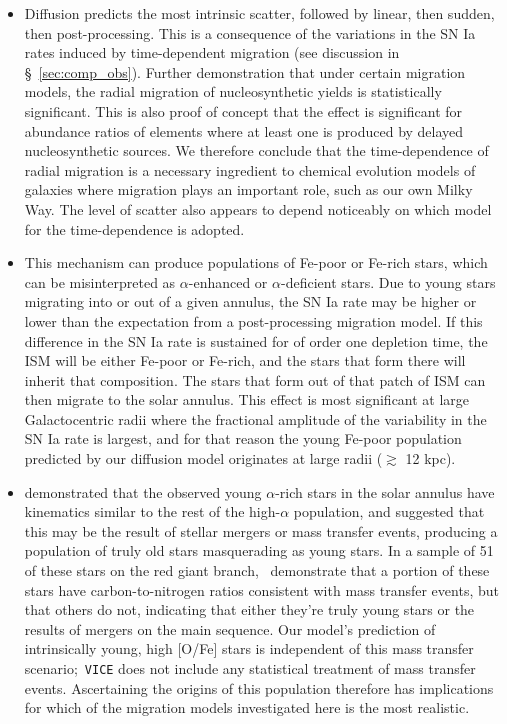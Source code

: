 \documentclass[fleqn, usenatbib]{mnras}
\begin{document}
\begin{itemize}
	\item Diffusion predicts the most intrinsic scatter, followed by linear, 
	then sudden, then post-processing. This is a consequence of the variations 
	in the SN Ia rates induced by time-dependent migration (see discussion in 
	\S~\ref{sec:comp_obs}). Further demonstration that under 
	certain migration models, the radial migration of nucleosynthetic yields 
	is statistically significant. This is also proof of concept that the 
	effect is significant for abundance ratios of elements where at least one 
	is produced by delayed nucleosynthetic sources. We therefore conclude that 
	the time-dependence of radial migration is a necessary ingredient to 
	chemical evolution models of galaxies where migration plays an important 
	role, such as our own Milky Way. The level of scatter also appears to 
	depend noticeably on which model for the time-dependence is adopted. 

	\item This mechanism can produce populations of Fe-poor or Fe-rich stars, 
	which can be misinterpreted as $\alpha$-enhanced or $\alpha$-deficient 
	stars. Due to young stars migrating into or out of a given annulus, the SN 
	Ia rate may be higher or lower than the expectation from a post-processing 
	migration model. If this difference in the SN Ia rate is sustained for of 
	order one depletion time, the ISM will be either Fe-poor or Fe-rich, and 
	the stars that form there will inherit that composition. The stars that 
	form out of that patch of ISM can then migrate to the solar annulus. This 
	effect is most significant at large Galactocentric radii where the 
	fractional amplitude of the variability in the SN Ia rate is largest, and 
	for that reason the young Fe-poor population predicted by our diffusion 
	model originates at large radii ($\gtrsim$ 12 kpc). 

	\item \citet{SilvaAguirre2018} demonstrated that the observed young 
	$\alpha$-rich stars in the solar annulus have kinematics similar to the 
	rest of the high-$\alpha$ population, and suggested that this may be the 
	result of stellar mergers or mass transfer events, producing a population 
	of truly old stars masquerading as young stars. In a sample of 51 of these 
	stars on the red giant branch,~\citet{Hekker2019} demonstrate that a 
	portion of these stars have carbon-to-nitrogen ratios consistent with 
	mass transfer events, but that others do not, indicating that either 
	they're truly young stars or the results of mergers on the main sequence. 
	Our model's prediction of intrinsically young, high [O/Fe] stars is 
	independent of this mass transfer scenario;~\texttt{VICE} does not include 
	any statistical treatment of mass transfer events. Ascertaining the origins 
	of this population therefore has implications for which of the migration 
	models investigated here is the most realistic. 


\end{itemize}
\end{document}
